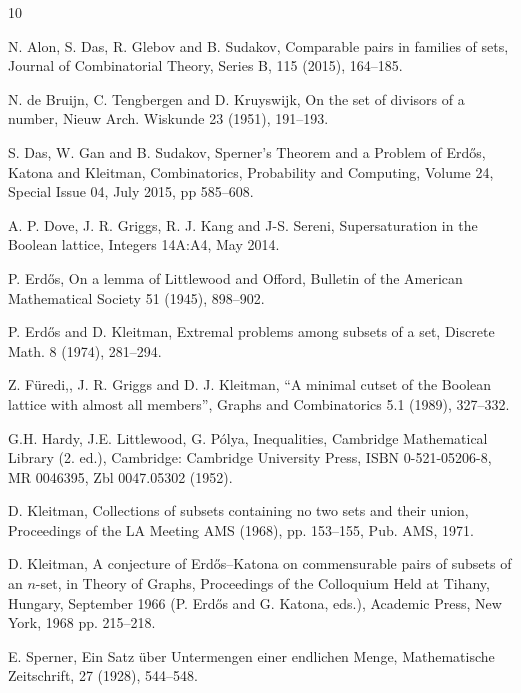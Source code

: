 \documentclass[12pt]{article}
\numberwithin{equation}{section}
\begin{document}
\begin{thebibliography}{10}

 N. Alon, S. Das, R. Glebov and B. Sudakov, Comparable pairs in families of sets, Journal of Combinatorial Theory, Series B, 115 (2015), 164--185.

 N. de Bruijn, C. Tengbergen and D. Kruyswijk, On the set of divisors of a number, Nieuw Arch. Wiskunde
23 (1951), 191--193.

 S. Das, W. Gan and B. Sudakov,  Sperner's Theorem and a Problem of Erd\H{o}s, Katona and Kleitman, Combinatorics, Probability and Computing, Volume 24, Special Issue 04, July 2015, pp 585--608.

 A. P. Dove, J. R. Griggs, R. J. Kang and J-S. Sereni, Supersaturation in the Boolean lattice, Integers 14A:A4, May 2014.

 P. Erd\H{o}s, On a lemma of Littlewood and Offord, Bulletin of the American Mathematical Society
51 (1945), 898--902.

 P. Erd\H{o}s and D. Kleitman, Extremal problems among subsets of a set, Discrete Math. 8 (1974), 281--294.

 Z. F\"{u}redi,, J. R. Griggs and D. J. Kleitman, ``A minimal cutset of the Boolean lattice with almost all members'', Graphs and Combinatorics 5.1 (1989), 327--332.

 G.H. Hardy, J.E. Littlewood, G. P\'{o}lya, Inequalities, Cambridge Mathematical Library (2. ed.), Cambridge: Cambridge University Press, ISBN 0-521-05206-8, MR 0046395, Zbl 0047.05302  (1952).



 D. Kleitman, Collections of subsets containing no two sets and their union, Proceedings of the LA Meeting AMS (1968), pp. 153--155, Pub. AMS, 1971.

 D. Kleitman, A conjecture of Erd\H{o}s--Katona on commensurable pairs of subsets of an $n$-set, in Theory of Graphs, Proceedings of the Colloquium Held at Tihany, Hungary, September 1966 (P.
Erd\H{o}s and G. Katona, eds.), Academic Press, New York, 1968 pp. 215--218.

 E. Sperner, Ein Satz \"{u}ber Untermengen einer endlichen Menge, Mathematische Zeitschrift,
27 (1928), 544--548.



\end{thebibliography}
\end{document}
